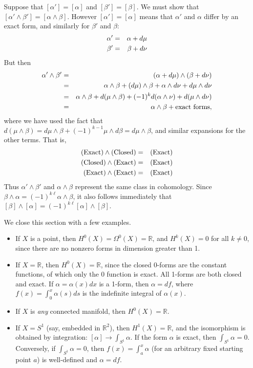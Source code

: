 \documentclass[12pt]{amsbook}
\newcommand{\R}{{\mathbb R}}
\theoremstyle{definition}
\begin{document}
Suppose that $[\alpha']=[\alpha]$ and $[\beta']=[\beta]$. We must show that
$[\alpha' \wedge \beta']=[\alpha \wedge \beta]$.  However $[\alpha']=[\alpha]$
means that $\alpha'$ and $\alpha$ differ by an exact form, and similarly
for $\beta'$ and $\beta$:
\begin{eqnarray*}
\alpha' &=& \alpha + d\mu \cr 
\beta' &=& \beta + d\nu
\end{eqnarray*}
But then 
\begin{eqnarray*}
\alpha' \wedge \beta' & = & (\alpha + d\mu) \wedge (\beta + d\nu) \cr 
& = & \alpha \wedge \beta + (d\mu)\wedge \beta + \alpha \wedge d\nu
+ d\mu \wedge d\nu \cr 
&=& \alpha \wedge \beta + d(\mu \wedge \beta) + (-1)^k d(\alpha \wedge \nu)
+ d(\mu \wedge d\nu) \cr 
& = & \alpha \wedge \beta + \hbox{exact forms},
\end{eqnarray*}
where we have used the fact that $d(\mu\wedge \beta)=d\mu \wedge \beta
+ (-1)^{k-1}\mu \wedge d\beta = d\mu \wedge \beta$, and similar expansions 
for the other terms. That is, 
\begin{eqnarray*}
\hbox{(Exact)} \wedge \hbox{(Closed)} & = & \hbox{(Exact)} \cr 
\hbox{(Closed)} \wedge \hbox{(Exact)} & = & \hbox{(Exact)} \cr 
\hbox{(Exact)} \wedge \hbox{(Exact)} & = & \hbox{(Exact)}
\end{eqnarray*}
Thus $\alpha'\wedge \beta'$ and $\alpha\wedge \beta$ represent the same 
class in cohomology.    
Since $\beta \wedge \alpha = (-1)^{k\ell} \alpha \wedge \beta$, it also follows 
immediately that $[\beta]\wedge [\alpha] = (-1)^{k\ell} [\alpha]\wedge[\beta]$.
 
We close this section with a few examples. 
\begin{itemize}
\item If $X$ is a point, then $H^0(X)=\Omega^0(X)=\R$, and $H^k(X)=0$ for
all $k\ne 0$, since there are no nonzero forms in dimension greater than 1.
\item If $X=\R$, then $H^0(X)=\R$, since the closed 0-forms are the
constant functions, of which only the 0 function is exact. All 1-forms are
both closed and exact. If $\alpha = \alpha(x) dx$ is a 1-form, then 
$\alpha = df$, where $f(x) = \int_0^x \alpha(s) ds$ is the indefinite integral
of $\alpha(x)$.
\item If $X$ is {\em any} connected manifold, then $H^0(X)=\R$. 
\item If $X = S^1$ (say, embedded in $\R^2$), then $H^1(X)=\R$, and the 
isomorphism is obtained by integration: $[\alpha] \to \int_{S^1} \alpha$. 
If the form $\alpha$ is exact, then $\int_{S^1} \alpha = 0$. Conversely, if 
$\int_{S^1} \alpha=0$, then $f(x)=\int_a^x \alpha$ (for an arbitrary 
fixed starting point $a$) is well-defined and $\alpha=df$. 
\end{itemize}
\end{document}
